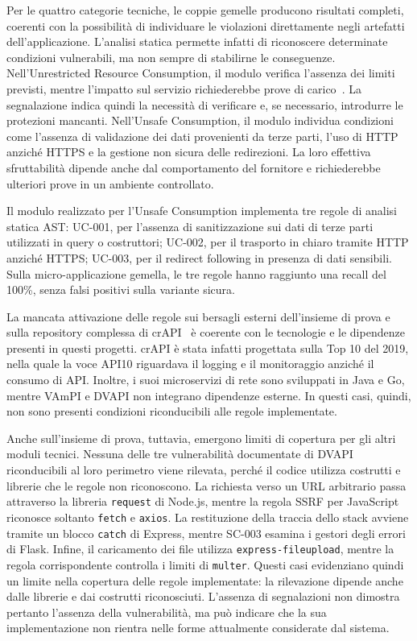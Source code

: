 Per le quattro categorie tecniche, le coppie gemelle producono risultati completi, coerenti con la possibilità di individuare le violazioni direttamente negli artefatti dell'applicazione. L'analisi statica permette infatti di riconoscere determinate condizioni vulnerabili, ma non sempre di stabilirne le conseguenze. Nell'Unrestricted Resource Consumption, il modulo verifica l'assenza dei limiti previsti, mentre l'impatto sul servizio richiederebbe prove di carico~\cite{owasp2023api4,antunes2008resource}. La segnalazione indica quindi la necessità di verificare e, se necessario, introdurre le protezioni mancanti. Nell'Unsafe Consumption, il modulo individua condizioni come l'assenza di validazione dei dati provenienti da terze parti, l'uso di HTTP anziché HTTPS e la gestione non sicura delle redirezioni. La loro effettiva sfruttabilità dipende anche dal comportamento del fornitore e richiederebbe ulteriori prove in un ambiente controllato.

Il modulo realizzato per l'Unsafe Consumption implementa tre regole di analisi statica AST: UC-001, per l'assenza di sanitizzazione sui dati di terze parti utilizzati in query o costruttori; UC-002, per il trasporto in chiaro tramite HTTP anziché HTTPS; UC-003, per il redirect following in presenza di dati sensibili. Sulla micro-applicazione gemella, le tre regole hanno raggiunto una recall del 100\%, senza falsi positivi sulla variante sicura.

La mancata attivazione delle regole sui bersagli esterni dell'insieme di prova e sulla repository complessa di crAPI~\cite{owasp2026crapi} è coerente con le tecnologie e le dipendenze presenti in questi progetti. crAPI è stata infatti progettata sulla Top 10 del 2019, nella quale la voce API10 riguardava il logging e il monitoraggio anziché il consumo di API. Inoltre, i suoi microservizi di rete sono sviluppati in Java e Go, mentre VAmPI e DVAPI non integrano dipendenze esterne. In questi casi, quindi, non sono presenti condizioni riconducibili alle regole implementate.

Anche sull'insieme di prova, tuttavia, emergono limiti di copertura per gli altri moduli tecnici. Nessuna delle tre vulnerabilità documentate di DVAPI riconducibili al loro perimetro viene rilevata, perché il codice utilizza costrutti e librerie che le regole non riconoscono. La richiesta verso un URL arbitrario passa attraverso la libreria \texttt{request} di Node.js, mentre la regola SSRF per JavaScript riconosce soltanto \texttt{fetch} e \texttt{axios}. La restituzione della traccia dello stack avviene tramite un blocco \texttt{catch} di Express, mentre SC-003 esamina i gestori degli errori di Flask. Infine, il caricamento dei file utilizza \texttt{express-fileupload}, mentre la regola corrispondente controlla i limiti di \texttt{multer}. Questi casi evidenziano quindi un limite nella copertura delle regole implementate: la rilevazione dipende anche dalle librerie e dai costrutti riconosciuti. L'assenza di segnalazioni non dimostra pertanto l'assenza della vulnerabilità, ma può indicare che la sua implementazione non rientra nelle forme attualmente considerate dal sistema.

